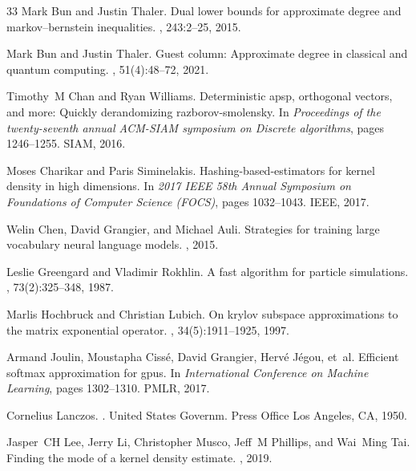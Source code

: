 \documentclass[10pt,a4paper]{article}
\theoremstyle{plain}\newtheorem{theorem}{Theorem}
\theoremstyle{definition}
\begin{document}
\begin{thebibliography}{33}
Mark Bun and Justin Thaler.
\newblock Dual lower bounds for approximate degree and markov--bernstein
  inequalities.
, 243:2--25, 2015.

Mark Bun and Justin Thaler.
\newblock Guest column: Approximate degree in classical and quantum computing.
, 51(4):48--72, 2021.

Timothy~M Chan and Ryan Williams.
\newblock Deterministic apsp, orthogonal vectors, and more: Quickly
  derandomizing razborov-smolensky.
\newblock In {\em Proceedings of the twenty-seventh annual ACM-SIAM symposium
  on Discrete algorithms}, pages 1246--1255. SIAM, 2016.

Moses Charikar and Paris Siminelakis.
\newblock Hashing-based-estimators for kernel density in high dimensions.
\newblock In {\em 2017 IEEE 58th Annual Symposium on Foundations of Computer
  Science (FOCS)}, pages 1032--1043. IEEE, 2017.

Welin Chen, David Grangier, and Michael Auli.
\newblock Strategies for training large vocabulary neural language models.
, 2015.

Leslie Greengard and Vladimir Rokhlin.
\newblock A fast algorithm for particle simulations.
, 73(2):325--348, 1987.

Marlis Hochbruck and Christian Lubich.
\newblock On krylov subspace approximations to the matrix exponential operator.
, 34(5):1911--1925, 1997.

Armand Joulin, Moustapha Ciss{\'e}, David Grangier, Herv{\'e} J{\'e}gou, et~al.
\newblock Efficient softmax approximation for gpus.
\newblock In {\em International Conference on Machine Learning}, pages
  1302--1310. PMLR, 2017.

Cornelius Lanczos.
.
\newblock United States Governm. Press Office Los Angeles, CA, 1950.

Jasper~CH Lee, Jerry Li, Christopher Musco, Jeff~M Phillips, and Wai~Ming Tai.
\newblock Finding the mode of a kernel density estimate.
, 2019.


\end{thebibliography}
\end{document}
